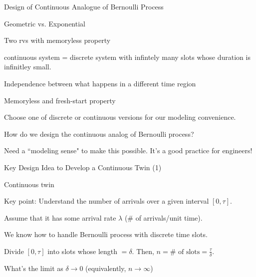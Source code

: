 \begin{frame}{Design of Continuous Analogue of Bernoulli Process}

\plitemsep 0.07in
\bci
\item {} Geometric vs. Exponential \hfill {}
  \bci
\item Two rvs with memoryless property
\item continuous system = discrete system with infintely many slots
  whose duration is infinitley small. 
  \eci
  

\item<2-> Independence between what happens in a different time region

\item<3-> Memoryless and fresh-start property

\item<4-> Choose one of discrete or continuous versions for our modeling convenience.

\item<5->  How do we design the continuous analog of Bernoulli process?


\item<8-> Need a ``modeling sense" to make this possible. It's a good
  practice for engineers! 
\item<8->  
  \eci
\end{frame}

\begin{frame}{Key Design Idea to Develop a Continuous Twin (1)}

\plitemsep 0.1in
\bci
\item<1-> Continuous twin

\bci
\item<2-> Key point: Understand the number of arrivals over a given interval $[0,\tau].$

\item<3-> Assume that it has some arrival rate $\lambda$ (\# of arrivals/unit time).

\item<4-> We know how to handle Bernoulli process with discrete time slots.
\eci


\item<5-> Divide $[0,\tau]$ into slots whose length $=\delta.$ Then, $n= \# \text{ of slots} = \frac{\tau}{\delta}.$
\begin{center}
\end{center}

\item<6-> What's the limit as $\delta \rightarrow 0$ (equivalently, $n \rightarrow \infty$)

\eci
\end{frame}


